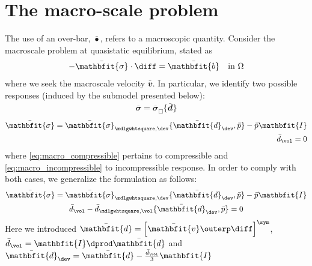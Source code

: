 \documentclass[a4paper,11pt]{article}
\renewcommand{\ta}[1]{\mathbfit{#1}}
\renewcommand{\ts}[1]{\mathbfit{#1}}
\renewcommand{\Box}{\mdlgwhtsquare}
\begin{document}
\section{The macro-scale problem} \label{sec:macro}
The use of an over-bar, $\bar{\bullet}$, refers to a macroscopic quantity.
Consider the macroscale problem at quasistatic equilibrium, stated as
\begin{align}
 -\bar{\ts\sigma}\cdot \diff = \bar{\ts b} \quad \text{in } \Omega
\end{align}
where we seek the macroscale velocity $\bar{\ts v}$. In particular, we identify two possible responses (induced by the submodel presented below):
\begin{gather}
 \bar{\ts\sigma} = \bar{\ts\sigma}_\Box\{\bar{\ts d}\} \label{eq:macro_compressible}
\end{gather}
\vspace{-2\baselineskip} %
\begin{subequations} \label{eq:macro_incompressible}
\begin{align}
  \bar{\ts\sigma} = \bar{\ts\sigma}_{\Box,\dev}\{\bar{\ts d}_\dev, \bar p\} - \bar p \ts I\\
  \bar{d}_\vol = 0
\end{align}
\end{subequations}
where \eqref{eq:macro_compressible} pertains to compressible and \eqref{eq:macro_incompressible} to incompressible response.
In order to comply with both cases, we generalize the formulation as follows:
\begin{subequations} \label{eq:macro_mixed}
\begin{gather}
 \bar{\ts\sigma} = \bar{\ts\sigma}_{\Box,\dev}\{\bar{\ts d}_\dev,\bar p\} - \bar p\ts I\\
 \bar{d}_\vol - \bar{d}_{\Box,\vol}\{\bar{\ts d}_\dev, \bar p\} = 0
\end{gather}
\end{subequations}
Here we introduced $\bar{\ts d} = \left[ \bar{\ta v} \outerp \diff \right]^\sym$, $\bar{d}_\vol = \ts I \dprod \bar{\ts d}$ and $\bar{\ts d}_\dev = \bar{\ts d} - \frac{\bar d_\vol}{3}\ts I$ 
\end{document}
